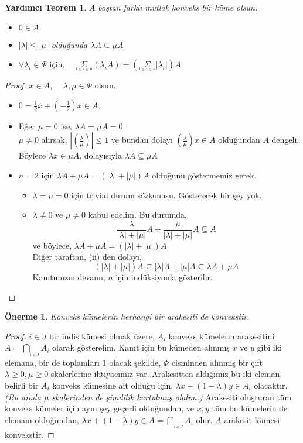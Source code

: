 \documentclass[11pt]{article}
\theoremstyle{plain}
\newtheorem{lemma}{Yardımcı Teorem}
\newtheorem{proposition}{Önerme}
\theoremstyle{definition}
\theoremstyle{remark}
\numberwithin{equation}{section}
\renewcommand{\%}{{\small \%}}
\begin{document}
\begin{lemma} $A$ boştan farklı mutlak konveks bir küme olsun.
\begin{itemize}
\item[(i)] $0\in A$
\item[(ii)]$|\lambda|\leq|\mu|$ olduğunda $\lambda A\subseteq\mu A$
\item[(iii)] $\forall\lambda_i\in\Phi\text{ için, }\quad\underset{_{1\leq i\leq n}}\Sigma\left(\lambda_i A\right)=\left(\underset{_{1\leq i\leq n}}\Sigma|\lambda_i|\right)A$\newpage
\end{itemize}
\end{lemma}
\begin{proof}$x\in A$, $\quad\lambda,\mu\in\Phi$ olsun.
\begin{itemize}
\item[(i)] $0=\frac{1}{2}x+\left(-\frac{1}{2}\right)x\in A.$
\item[(ii)] Eğer $\mu=0$ ise, $\lambda A=\mu A=0$\\
$\mu\neq0$ alırsak, $|\left(\frac{\lambda}{\mu}\right)|\leq 1$ ve bundan dolayı $\left(\frac{\lambda}{\mu}\right)x\in A$ olduğundan $A$ dengeli. Böylece $\lambda x\in\mu A$, dolayısıyla $\lambda A\subseteq\mu A$
\item[(iii)] $n=2$ için $\lambda A+\mu A=\left(|\lambda|+|\mu|\right)A$ olduğunu göstermemiz gerek.
\begin{itemize}
\item [a)]$\lambda=\mu=0$ için trivial durum sözkonusu. Gösterecek bir şey yok.
\item [b)]$\lambda\neq 0$ ve $\mu\neq 0$ kabul edelim. Bu durumda,
\[
\frac{\lambda}{|\lambda|+|\mu|}A+\frac{\mu}{|\lambda|+|\mu|}A\subseteq A
\]
ve böylece, $\lambda A+\mu A=\left(|\lambda|+|\mu|\right)A$\\
Diğer taraftan, (ii) den dolayı,
\[
\left(|\lambda|+|\mu|\right)A\subseteq |\lambda|A+|\mu|A\subseteq \lambda A+\mu A
\] Kanıtımızın devamı, $n$ için indüksiyonla gösterilir.\\[5pt]
\end{itemize}
\end{itemize}
\end{proof}
\begin{proposition} Konveks kümelerin herhangi bir arakesiti de konvekstir.\label{arakesitkonv}\end{proposition}
\begin{proof}
$i\in J$ bir indis kümesi olmak üzere, $A_i$ konveks kümelerin arakesitini $A=\bigcap_{_{i\in J}}A_i$ olarak gösterelim. Kanıt için bu kümeden alınmış $x$ ve $y$ gibi iki elemana, bir de toplamları $1$ olacak şekilde, $\Phi$ cisminden alınmış bir çift $\lambda\geq 0,\mu\geq 0$ skalerlerine ihtiyacımız var. Arakesitten aldığımız bu iki eleman belirli bir $A_i$ konveks kümesine ait olduğu için, $\lambda x+\left(1-\lambda\right)y\in A_i$ olacaktır. \emph{(Bu arada $\mu$ skalerinden de şimdilik kurtulmuş olalım.)} Arakesiti oluşturan tüm konveks kümeler için aynı şey geçerli olduğundan, ve $x,y$ tüm bu kümelerin de elemanı olduğundan, $\lambda x+\left(1-\lambda\right)y\in A=\bigcap_{_{i\in J}}A_i$ olur. $A$ arakesit kümesi konvekstir.
\end{proof}
\end{document}

